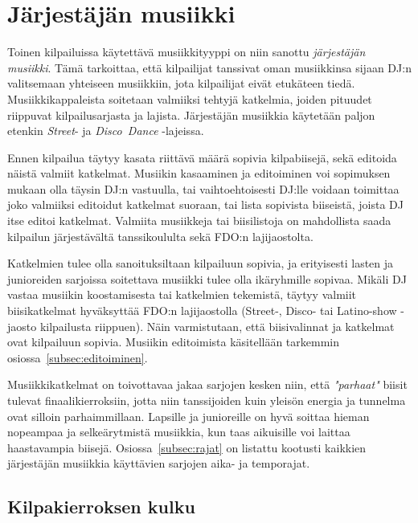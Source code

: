 \documentclass[12pt, a4paper, oneside]{article}
\begin{document}
\clearpage

\section{Järjestäjän musiikki} \label{sec:dj-musiikki}

Toinen kilpailuissa käytettävä musiikkityyppi on niin sanottu \textit{järjestäjän musiikki}.
Tämä tarkoittaa,
että kilpailijat tanssivat oman musiikkinsa sijaan DJ:n valitsemaan yhteiseen musiikkiin,
jota kilpailijat eivät etukäteen tiedä.
Musiikkikappaleista soitetaan valmiiksi tehtyjä katkelmia,
joiden pituudet riippuvat kilpailusarjasta ja lajista.
Järjestäjän musiikkia käytetään paljon etenkin \textit{Street}- ja \textit{Disco~Dance} -lajeissa.

Ennen kilpailua täytyy kasata riittävä määrä sopivia kilpabiisejä,
sekä editoida näistä valmiit katkelmat.
Musiikin kasaaminen ja editoiminen voi sopimuksen mukaan olla täysin DJ:n vastuulla,
tai vaihtoehtoisesti DJ:lle voidaan toimittaa joko valmiiksi editoidut katkelmat suoraan,
tai lista sopivista biiseistä,
joista DJ itse editoi katkelmat.
Valmiita musiikkeja tai biisilistoja on mahdollista saada kilpailun järjestävältä tanssikoululta sekä FDO:n lajijaostolta.

Katkelmien tulee olla sanoituksiltaan kilpailuun sopivia,
ja erityisesti lasten ja junioreiden sarjoissa soitettava musiikki tulee olla ikäryhmille sopivaa.
Mikäli DJ vastaa musiikin koostamisesta tai katkelmien tekemistä,
täytyy valmiit biisikatkelmat hyväksyttää FDO:n lajijaostolla (Street-, Disco- tai Latino-show -jaosto kilpailusta riippuen).
Näin varmistutaan,
että biisivalinnat ja katkelmat ovat kilpailuun sopivia.
Musiikin editoimista käsitellään tarkemmin osiossa~\ref{subsec:editoiminen}.

Musiikkikatkelmat on toivottavaa jakaa sarjojen kesken niin,
että \textit{"parhaat"} biisit tulevat finaalikierroksiin,
jotta niin tanssijoiden kuin yleisön energia ja tunnelma ovat silloin parhaimmillaan.
Lapsille ja junioreille on hyvä soittaa hieman nopeampaa ja selkeärytmistä musiikkia,
kun taas aikuisille voi laittaa haastavampia biisejä.
Osiossa~\ref{subsec:rajat} on listattu kootusti kaikkien järjestäjän musiikkia käyttävien sarjojen aika- ja temporajat.

\subsection{Kilpakierroksen kulku} \label{subsec:kilpakierroksen-kulku2}
\end{document}
